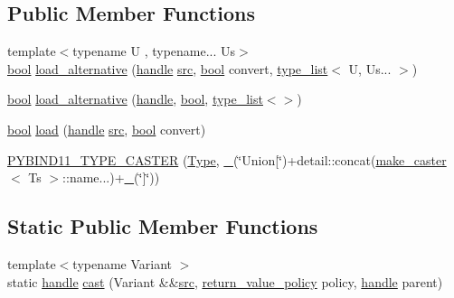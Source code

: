 \subsection*{Public Member Functions}
\begin{DoxyCompactItemize}
\item 
{\footnotesize template$<$typename U , typename... Us$>$ }\\\mbox{\hyperlink{asdl_8h_af6a258d8f3ee5206d682d799316314b1}{bool}} \mbox{\hyperlink{structvariant__caster_3_01_v_3_01_ts_8_8_8_01_4_01_4_ab0b8352e25d9313f6fddcb19d1ce1bb2}{load\+\_\+alternative}} (\mbox{\hyperlink{classhandle}{handle}} \mbox{\hyperlink{_s_d_l__opengl__glext_8h_a72e0fdf0f845ded60b1fada9e9195cd7}{src}}, \mbox{\hyperlink{asdl_8h_af6a258d8f3ee5206d682d799316314b1}{bool}} convert, \mbox{\hyperlink{structtype__list}{type\+\_\+list}}$<$ U, Us... $>$)
\item 
\mbox{\hyperlink{asdl_8h_af6a258d8f3ee5206d682d799316314b1}{bool}} \mbox{\hyperlink{structvariant__caster_3_01_v_3_01_ts_8_8_8_01_4_01_4_a6a1767174a525e0ce1b7adf4c7ee2cbb}{load\+\_\+alternative}} (\mbox{\hyperlink{classhandle}{handle}}, \mbox{\hyperlink{asdl_8h_af6a258d8f3ee5206d682d799316314b1}{bool}}, \mbox{\hyperlink{structtype__list}{type\+\_\+list}}$<$$>$)
\item 
\mbox{\hyperlink{asdl_8h_af6a258d8f3ee5206d682d799316314b1}{bool}} \mbox{\hyperlink{structvariant__caster_3_01_v_3_01_ts_8_8_8_01_4_01_4_a196dec699b44e16b730169c58701af6a}{load}} (\mbox{\hyperlink{classhandle}{handle}} \mbox{\hyperlink{_s_d_l__opengl__glext_8h_a72e0fdf0f845ded60b1fada9e9195cd7}{src}}, \mbox{\hyperlink{asdl_8h_af6a258d8f3ee5206d682d799316314b1}{bool}} convert)
\item 
\mbox{\hyperlink{structvariant__caster_3_01_v_3_01_ts_8_8_8_01_4_01_4_a3adec4059b0a4ff86b350c02541fcfff}{P\+Y\+B\+I\+N\+D11\+\_\+\+T\+Y\+P\+E\+\_\+\+C\+A\+S\+T\+ER}} (\mbox{\hyperlink{structvariant__caster_3_01_v_3_01_ts_8_8_8_01_4_01_4_af19893dac45401bbb67d1adfd284d463}{Type}}, \mbox{\hyperlink{descr_8h_af114703e20c6527e87163eb2798f74b8}{\+\_\+}}(\char`\"{}Union\mbox{[}\char`\"{})+detail\+::concat(\mbox{\hyperlink{cast_8h_ab32b52411a6b07420516d79074815713}{make\+\_\+caster}}$<$ Ts $>$\+::name...)+\mbox{\hyperlink{descr_8h_af114703e20c6527e87163eb2798f74b8}{\+\_\+}}(\char`\"{}\mbox{]}\char`\"{}))
\end{DoxyCompactItemize}
\subsection*{Static Public Member Functions}
\begin{DoxyCompactItemize}
\item 
{\footnotesize template$<$typename Variant $>$ }\\static \mbox{\hyperlink{classhandle}{handle}} \mbox{\hyperlink{structvariant__caster_3_01_v_3_01_ts_8_8_8_01_4_01_4_a4fc67a72a5dcdd1bfcdb2f99354b323a}{cast}} (Variant \&\&\mbox{\hyperlink{_s_d_l__opengl__glext_8h_a72e0fdf0f845ded60b1fada9e9195cd7}{src}}, \mbox{\hyperlink{detail_2common_8h_adde72ab1fb0dd4b48a5232c349a53841}{return\+\_\+value\+\_\+policy}} policy, \mbox{\hyperlink{classhandle}{handle}} parent)
\end{DoxyCompactItemize}



